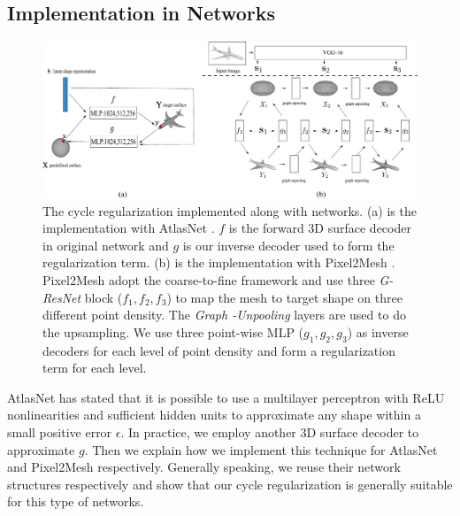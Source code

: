 \subsection{Implementation in Networks}
\begin{figure}[t]
	\centering
	\includegraphics[width=\linewidth]{img/net/net}
	\caption{The cycle regularization implemented along with networks. (a) is the implementation with AtlasNet \cite{atlasnet}. $f$ is the forward 3D surface decoder in original network and $g$ is our inverse decoder used to form the regularization term. (b) is the implementation with Pixel2Mesh \cite{pixel2mesh}.  Pixel2Mesh \cite{pixel2mesh} adopt the coarse-to-fine framework and use three \emph{G-ResNet} block ($f_1,f_2,f_3$) to map the mesh to target shape on three different point density. The \emph{Graph -Unpooling} layers are used to do the upsampling. We use three point-wise MLP ($g_1,g_2,g_3$) as inverse decoders for each level of point density and form a regularization term for each level.}
	\label{fig:net}
\end{figure}
 AtlasNet \cite{atlasnet} has stated that it is possible to use a multilayer perceptron with ReLU nonlinearities and sufficient hidden units to approximate any shape within a small positive error $\epsilon$. In practice, we employ another 3D surface decoder to approximate $g$. Then we explain how we implement this technique for AtlasNet and Pixel2Mesh respectively. Generally speaking, we reuse their network structures respectively and show that our cycle regularization is generally suitable for this type of networks.

